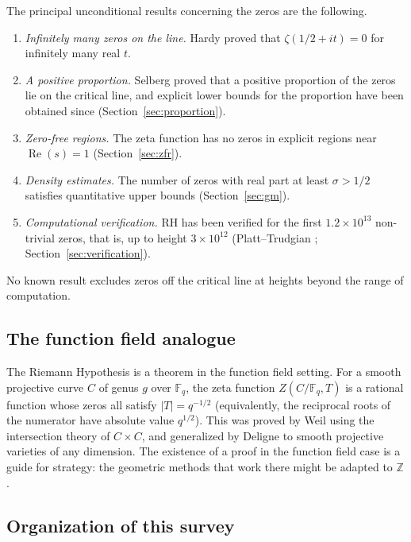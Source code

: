 \documentclass[11pt]{amsart}
\theoremstyle{definition}
\theoremstyle{remark}
\begin{document}
The principal unconditional results concerning the zeros are the following.
\begin{enumerate}[label=(\roman*)]
\item \emph{Infinitely many zeros on the line.} Hardy \cite{hardy1914} proved that $\zeta(1/2 + it) = 0$ for infinitely many real $t$.
\item \emph{A positive proportion.} Selberg \cite{selberg1942} proved that a positive proportion of the zeros lie on the critical line, and explicit lower bounds for the proportion have been obtained since (Section~\ref{sec:proportion}).
\item \emph{Zero-free regions.} The zeta function has no zeros in explicit regions near $\operatorname{Re}(s) = 1$ (Section~\ref{sec:zfr}).
\item \emph{Density estimates.} The number of zeros with real part at least $\sigma>1/2$ satisfies quantitative upper bounds (Section~\ref{sec:gm}).
\item \emph{Computational verification.} RH has been verified for the first $1.2 \times 10^{13}$ non-trivial zeros, that is, up to height $3 \times 10^{12}$ (Platt--Trudgian \cite{platt2021}; Section~\ref{sec:verification}).
\end{enumerate}
No known result excludes zeros off the critical line at heights beyond the range of computation.

\subsection{The function field analogue}\label{sec:ff-intro}

The Riemann Hypothesis is a theorem in the function field setting. For a smooth projective curve $C$ of genus $g$ over $\mathbb{F}_q$, the zeta function $Z(C/\mathbb{F}_q, T)$ is a rational function whose zeros all satisfy $|T| = q^{-1/2}$ (equivalently, the reciprocal roots of the numerator have absolute value $q^{1/2}$). This was proved by Weil \cite{weil1948} using the intersection theory of $C \times C$, and generalized by Deligne \cite{deligne1974} to smooth projective varieties of any dimension. The existence of a proof in the function field case is a guide for strategy: the geometric methods that work there might be adapted to $\mathbb{Z}$.

\subsection{Organization of this survey}
\end{document}
